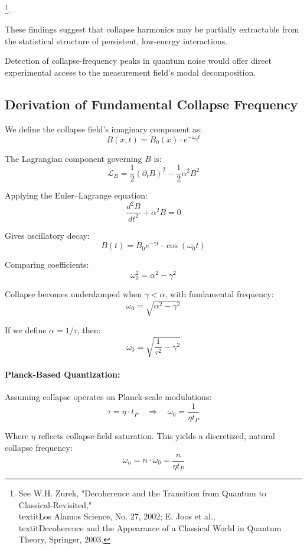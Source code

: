 \footnote{See W.H. Zurek, "Decoherence and the Transition from Quantum to Classical-Revisited," \\textit{Los Alamos Science}, No. 27, 2002; E. \cite{imaginary_meta} Joos et al., \\textit{Decoherence and the Appearance of a Classical World in Quantum Theory}, Springer, 2003.}. 

These findings suggest that collapse harmonics may be partially extractable from the statistical structure of persistent, low-energy interactions. \cite{imaginary_meta} 

Detection of collapse-frequency peaks in quantum noise would offer direct experimental access to the measurement field’s modal decomposition. \cite{imaginary_meta} 

\subsection*{Derivation of Fundamental Collapse Frequency}

We define the collapse field's imaginary component as:
\[
B(x, t) = B_0(x) \cdot e^{-\omega_0 t}
\]

The Lagrangian component governing $B$ is:
\[
\mathcal{L}_B = \frac{1}{2} (\partial_t B)^2 - \frac{1}{2} \alpha^2 B^2
\]

Applying the Euler–Lagrange equation:
\[
\frac{d^2 B}{dt^2} + \alpha^2 B = 0
\]

Gives oscillatory decay:
\[
B(t) = B_0 e^{-\gamma t} \cdot \cos(\omega_0 t)
\]

Comparing coefficients:
\[
\omega_0^2 = \alpha^2 - \gamma^2
\]

Collapse becomes underdamped when \( \gamma < \alpha \), with fundamental frequency:
\[
\omega_0 = \sqrt{\alpha^2 - \gamma^2}
\]

If we define \( \alpha = 1/\tau \), then:
\[
\omega_0 = \sqrt{\frac{1}{\tau^2} - \gamma^2}
\]

\paragraph{Planck-Based Quantization:}
Assuming collapse operates on Planck-scale modulations:
\[
\tau = \eta \cdot t_P \quad \Rightarrow \quad \omega_0 = \frac{1}{\eta t_P}
\]

Where \( \eta \) reflects collapse-field saturation. \cite{imaginary_meta} This yields a discretized, natural collapse frequency:
\[
\omega_n = n \cdot \omega_0 = \frac{n}{\eta t_P}
\]

